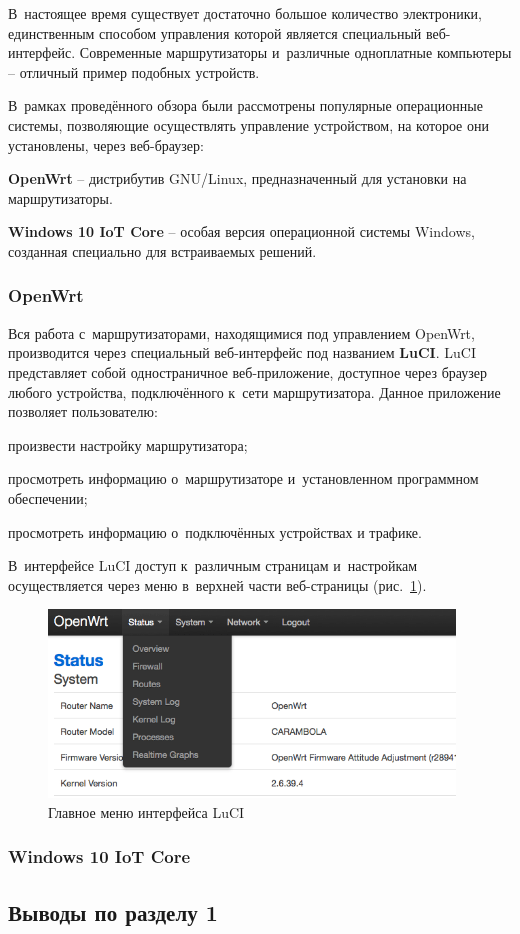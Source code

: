 В~настоящее время существует достаточно большое количество электроники, единственным способом управления которой является специальный веб-интерфейс. Современные маршрутизаторы и~различные одноплатные компьютеры -- отличный пример подобных устройств. \par

В~рамках проведённого обзора были рассмотрены популярные операционные системы, позволяющие осуществлять управление устройством, на которое они установлены, через веб-браузер:

\begin{dashitemize}
  \item \textbf{OpenWrt} -- дистрибутив GNU/Linux, предназначенный для установки на маршрутизаторы.
  \item \textbf{Windows 10 IoT Core} -- особая версия операционной системы Windows, созданная специально для встраиваемых решений.
\end{dashitemize}

\subsubsection{OpenWrt}

Вся работа с~маршрутизаторами, находящимися под управлением OpenWrt, производится через специальный веб-интерфейс под названием \textbf{LuCI}. LuCI представляет собой одностраничное веб-приложение, доступное через браузер любого устройства, подключённого к~сети маршрутизатора. Данное приложение позволяет пользователю:

\begin{dashitemize}
  \item произвести настройку маршрутизатора;
  \item просмотреть информацию о~маршрутизаторе и~установленном программном обеспечении;
  \item просмотреть информацию о~подключённых устройствах и трафике.
\end{dashitemize}

В~интерфейсе LuCI доступ к~различным страницам и~настройкам осуществляется через меню в~верхней части веб-страницы (рис.~\ref{fig:openwrt-menu}). 

\begin{figure}[h!]
  \centering
  \includegraphics[height=5cm]{img/openwrt-menu}
  \vspace*{12pt}
  \caption{Главное меню интерфейса LuCI}\label{fig:openwrt-menu}
\end{figure}

\subsubsection{Windows 10 IoT Core}

\subsection{Выводы по разделу 1}

\newpage
